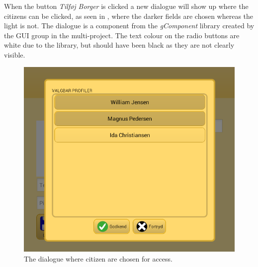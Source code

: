 When the button \textit{Tilføj Borger} is clicked a new dialogue will show up where the citizens can be clicked, as seen in , where the darker fields are chosen whereas the light is not.
The dialogue is a component from the \textit{gComponent} library created by the GUI group in the multi-project.
The text colour on the radio buttons are white due to the library, but should have been black as they are not clearly visible.

\begin{figure}[h]
	\centering
	\includegraphics[scale=0.5]{media/sprint4/save_dialog3}
	\caption{The dialogue where citizen are chosen for access.}
	\label{fig:save_dialogue3}
\end{figure}
